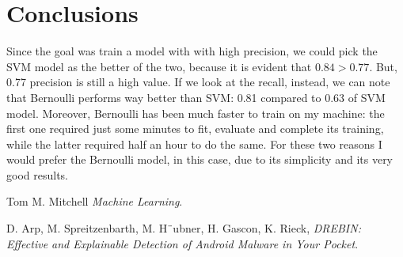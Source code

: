 \documentclass[12pt]{article}
\begin{document}
\section{Conclusions}
Since the goal was train a model with with high precision, we could pick the SVM model as the better of the two, because it is evident that $0.84 > 0.77$. But, 0.77 precision is still a high value. If we look at the recall, instead, we can note that Bernoulli performs way better than SVM: 0.81 compared to 0.63 of SVM model. Moreover, Bernoulli has been much faster to train on my machine: the first one required just some minutes to fit, evaluate and complete its training, while the latter required half an hour to do the same. For these two reasons I would prefer the Bernoulli model, in this case, due to its simplicity and its very good results. 

\newpage
\begin{thebibliography}{10}
	
	Tom M. Mitchell \textsl{Machine Learning}.
	
	D. Arp, M. Spreitzenbarth, M. H¨ubner, H. Gascon, K. Rieck, \textsl{DREBIN: Effective and Explainable Detection of Android Malware in Your Pocket}.
	
\end{thebibliography}
\end{document}
